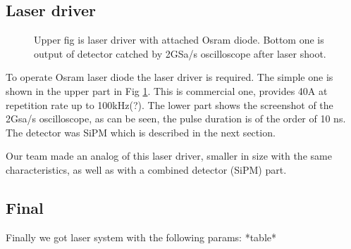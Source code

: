 \subsection{Laser driver}

\noindent\begin{minipage}{0.5\textwidth}
\begin{figure}[H]
\vspace{-3mm}
\caption{Upper fig is laser driver with attached Osram diode. Bottom one is output of detector catched by 2GSa/s oscilloscope after laser shoot. }
\label{fig:laser_driver}
\end{figure}
\end{minipage}
\hfill
\begin{minipage}{0.4\textwidth}
To operate Osram laser diode the laser driver is required. The simple one is shown in the upper part in Fig \ref{fig:laser_driver}.
This is commercial one, provides 40A at repetition rate up to 100kHz(?).
The lower part shows the screenshot of the 2Gsa/s oscilloscope, as can be seen, the pulse duration is of the order of 10 ns. The detector was SiPM which is described in the next section.

Our team made an analog of this laser driver, smaller in size with the same characteristics, as well as with a combined detector (SiPM) part. 

\subsection{Final}
Finally we got laser system with the following params:
*table*


\end{minipage}

